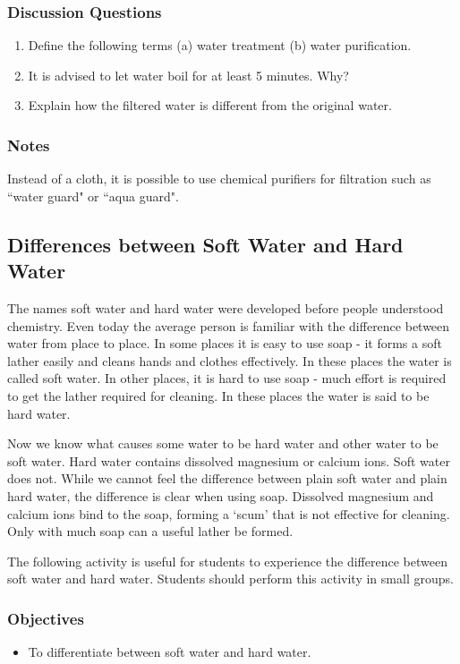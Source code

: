 \subsubsection*{Discussion Questions}
\begin{enumerate}
\item{Define the following terms (a) water treatment (b) water purification.}
\item{It is advised to let water boil for at least 5 minutes. Why?}
\item{Explain how the filtered water is different from the original water.}
\end{enumerate}

\subsubsection*{Notes}
Instead of a cloth, it is possible to use chemical purifiers for filtration such as ``water guard" or ``aqua guard".

\subsection{Differences between Soft Water and Hard Water}

The names soft water and hard water were developed before people understood chemistry. Even today the average person is familiar with the difference between water from place to place. In some places it is easy to use soap - it forms a soft lather easily and cleans hands and clothes effectively. In these places the water is called soft water. In other places, it is hard to use soap - much effort is required to get the lather required for cleaning. In these places the water is said to be hard water.

Now we know what causes some water to be hard water and other water to be soft water. Hard water contains dissolved magnesium or calcium ions. Soft water does not. While we cannot feel the difference between plain soft water and plain hard water, the difference is clear when using soap. Dissolved magnesium and calcium ions bind to the soap, forming a `scum' that is not effective for cleaning. Only with much soap can a useful lather be formed.

The following activity is useful for students to experience the difference between soft water and hard water. Students should perform this activity in small groups.

\subsubsection*{Objectives}
\begin{itemize}
\item{To differentiate between soft water and hard water.}
\end{itemize}

